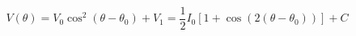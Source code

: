 \begin{equation}
\label{eq:Photodiode_Voltage}
V(\theta) = V_{0} \cos^2(\theta - {\theta}_0)+ V_{1} = \frac{1}{2}I_0\left[1 + \cos(2 (\theta - \theta_0))\right]+ C
\end{equation}
